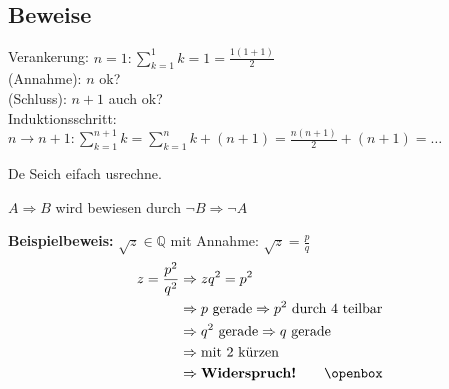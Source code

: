 \documentclass[a4paper]{article}
\begin{document}
\subsection{Beweise}
	\begin{multicols}{2}

	\begin{falgo}
	Verankerung: $n=1: \sum\limits_{k=1}^{1}k = 1 = \frac{1(1+1)}{2}$ \\
	(Annahme): $n$ ok? \\
	(Schluss): $n+1$ auch ok? \\
	Induktionsschritt: $n \rightarrow n+1: \sum\limits_{k=1}^{n+1}k = \sum\limits_{k=1}^{n}k + (n+1) = \frac{n(n+1)}{2} + (n+1) = \dots$
	\end{falgo}

	\begin{falgo}
	De Seich eifach usrechne.
	\end{falgo}
	
	\begin{falgo}
		$A \Rightarrow B$ wird bewiesen durch $\neg B \Rightarrow \neg A$ \\
	\end{falgo}
	
	\textbf{Beispielbeweis:} $\sqrt{z} \in \mathbb{Q}$ mit Annahme: $\sqrt{z} = \frac{p}{q}$
	\begin{align*}
	z = \frac{p^2}{q^2} & \Rightarrow zq^2 = p^2 \\
						& \Rightarrow \text{$p$ gerade} \Rightarrow \text{$p^2$ durch 4 teilbar} \\
						& \Rightarrow \text{$q^2$ gerade} \Rightarrow \text{$q$ gerade} \\
						& \Rightarrow \text{mit 2 kürzen} \\
						& \Rightarrow \textbf{Widerspruch!} \qquad \openbox
	\end{align*}

	\end{multicols}
\end{document}
